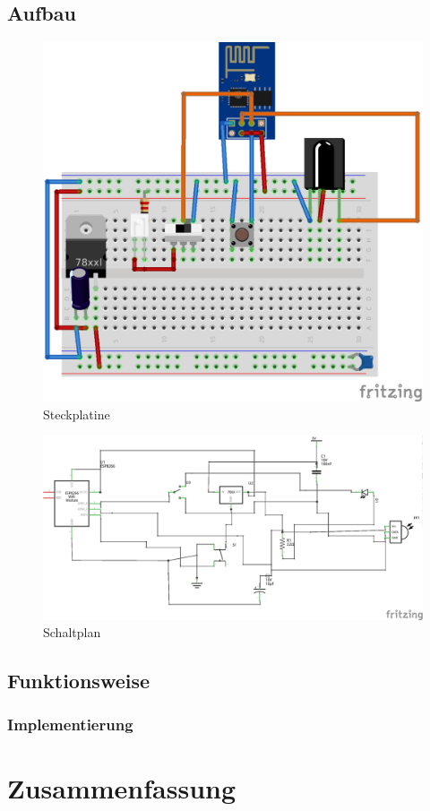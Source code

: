 \subsection{Aufbau}

\begin{figure}
	\centering
	\includegraphics[scale=1]{Abbildungen/ESP8266_Steckplatine}
	\caption{Steckplatine}
\end{figure}

\begin{figure}
	\centering
	\includegraphics[scale=1]{Abbildungen/ESP8266_Schaltplan}
	\caption{Schaltplan}
\end{figure}


\subsection{Funktionsweise}
\subsubsection{Implementierung}
\section{Zusammenfassung}

\pagestyle{empty}										%
